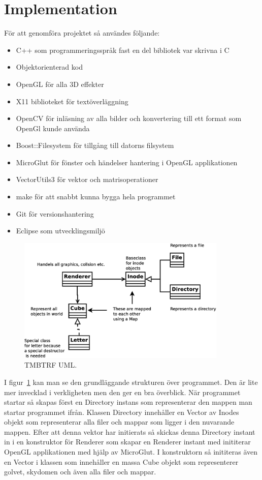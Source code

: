 \section{Implementation}
För att genomföra projektet så användes följande:
\begin{itemize}
\item C++ som programmeringsspråk fast en del bibliotek var skrivna i C
\item Objektorienterad kod
\item OpenGL för alla 3D effekter
\item X11 biblioteket för textöverläggning
\item OpenCV för inläsning av alla bilder och konvertering till ett format som OpenGl kunde använda
\item Boost::Filesystem för tillgång till datorns filsystem
\item MicroGlut för fönster och händelser hantering i OpenGL applikationen
\item VectorUtils3 för vektor och matrisoperationer
\item make för att snabbt kunna bygga hela programmet
\item Git för versionshantering
\item Eclipse som utvecklingsmiljö
\end{itemize}
\begin{center}
\begin{figure}[H]
    \centering
\includegraphics[width=10cm]{../grafik/uml.eps}
\caption{TMBTRF UML.}
\label{fig:uml}
\end{figure}
\end{center}
I figur~\ref{fig:uml} kan man se den grundläggande strukturen över programmet. Den är lite mer invecklad i verkligheten men den ger en bra överblick. När programmet startar så skapas först en Directory instans som representerar den mappen man startar programmet ifrån. Klassen Directory innehåller en Vector av Inodes objekt som representerar alla filer och mappar som ligger i den nuvarande mappen. Efter att denna vektor har initierats så skickas denna Directory instant in i en konstruktor för Renderer som skapar en Renderer instant med inititerar OpenGL applikationen med hjälp av MicroGlut. I konstruktorn så inititeras även en Vector i klassen som innehåller en massa Cube objekt som representerer golvet, skydomen och även alla filer och mappar. 
